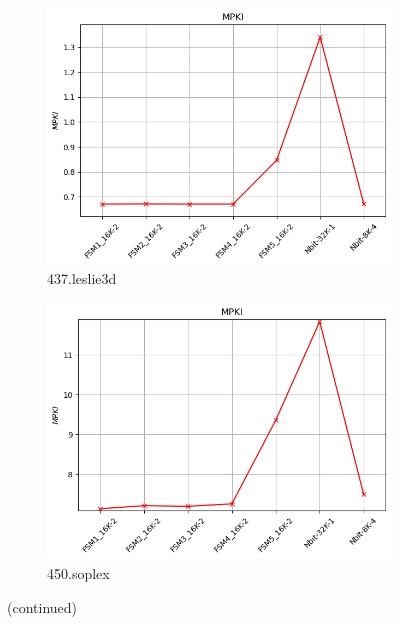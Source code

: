 \documentclass{article}
\begin{document}
\begin{figure}[H]
    \vspace{0.5cm} %

    \begin{subfigure}[b]{0.45\textwidth}
        \includegraphics[width=\textwidth]{figures/5_3_c/437.leslie3d.cslab_branch_preds_ref.out.png}
        \caption{437.leslie3d}
        \label{fig:plot41}
    \end{subfigure}
    \hfill
    \begin{subfigure}[b]{0.45\textwidth}
        \includegraphics[width=\textwidth]{figures/5_3_c/450.soplex.cslab_branch_preds_ref.out.png}
        \caption{450.soplex}
        \label{fig:plot42}       
    \end{subfigure}
    \vspace{0.5cm} 
 
    \caption{(continued)}
    \label{fig:32K_part2}
\end{figure}
\end{document}

